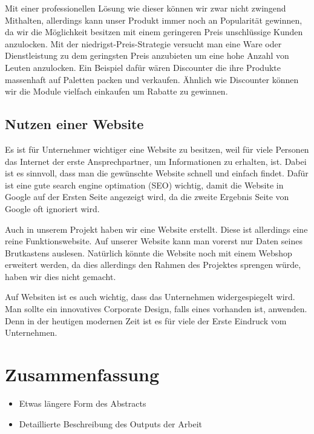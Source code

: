 Mit einer professionellen Lösung wie dieser können wir zwar nicht zwingend Mithalten, allerdings kann unser Produkt immer noch an Popularität gewinnen, da wir die Möglichkeit besitzen mit einem geringeren Preis unschlüssige Kunden anzulocken. Mit der niedrigst-Preis-Strategie versucht man eine Ware oder Dienstleistung zu dem geringsten Preis anzubieten um eine hohe Anzahl von Leuten anzulocken. Ein Beispiel dafür wären Discounter die ihre Produkte massenhaft auf Paletten packen und verkaufen. Ähnlich wie Discounter können wir die Module vielfach einkaufen um Rabatte zu gewinnen.





\newpage
\def \currentAuthor {Florian Tipotsch}
\section{Nutzen einer Website}
Es ist für Unternehmer wichtiger eine Website zu besitzen, weil für viele Personen das Internet der erste Ansprechpartner, um Informationen zu erhalten, ist. Dabei ist es sinnvoll, dass man die gewünschte Website schnell und einfach findet. Dafür ist eine gute search engine optimation (SEO) wichtig, damit die Website in Google auf der Ersten Seite angezeigt wird, da die zweite Ergebnis Seite von Google oft ignoriert wird.

Auch in unserem Projekt haben wir eine Website erstellt. Diese ist allerdings eine reine Funktionswebsite. Auf unserer Website kann man vorerst nur Daten seines Brutkastens auslesen. Natürlich könnte die Website noch mit einem Webshop erweitert werden, da dies allerdings den Rahmen des Projektes sprengen würde, haben wir dies nicht gemacht.

Auf Websiten ist es auch wichtig, dass das Unternehmen widergespiegelt wird. Man sollte ein innovatives Corporate Design, falls eines vorhanden ist, anwenden. Denn in der heutigen modernen Zeit ist es für viele der Erste Eindruck vom Unternehmen.

\chapter{Zusammenfassung}
\begin{itemize}
	\item Etwas längere Form des Abstracts
	\item Detaillierte Beschreibung des Outputs der Arbeit
\end{itemize}